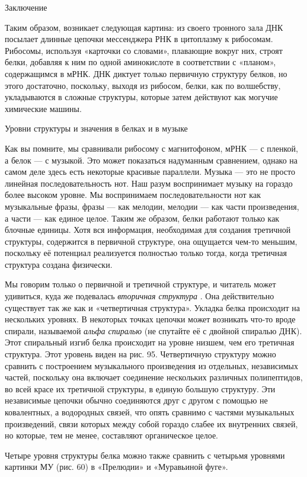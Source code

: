 \documentclass[../main.tex]{subfiles}
\begin{document}
Заключение

Таким образом, возникает следующая картина: из своего тронного зала ДНК посылает длинные цепочки мессенджера РНК в цитоплазму к рибосомам. Рибосомы, используя «карточки со словами», плавающие вокруг них, строят белки, добавляя к ним по одной аминокислоте в соответствии с «планом», содержащимся в мРНК\@. ДНК диктует только первичную структуру белков, но этого достаточно, поскольку, выходя из рибосом, белки, как по волшебству, укладываются в сложные структуры, которые затем действуют как могучие химические машины.

Уровни структуры и значения в белках и в музыке

Как вы помните, мы сравнивали рибосому с магнитофоном, мРНК --- с пленкой, а белок --- с музыкой. Это может показаться надуманным сравнением, однако на самом деле здесь есть некоторые красивые параллели. Музыка --- это не просто линейная последовательность нот. Наш разум воспринимает музыку на гораздо более высоком уровне. Мы воспринимаем последовательности нот как музыкальные фразы, фразы --- как мелодии, мелодии --- как части произведения, а части --- как единое целое. Таким же образом, белки работают только как блочные единицы. Хотя вся информация, необходимая для создания третичной структуры, содержится в первичной структуре, она ощущается чем-то меньшим, поскольку её потенциал реализуется полностью только тогда, когда третичная структура создана физически.

Мы говорим только о первичной и третичной структуре, и читатель может удивиться, куда же подевалась \emph{вторичная структура} . Она действительно существует так же как и «четвертичная структура». Укладка белка происходит на нескольких уровнях. В некоторых точках цепочки может возникать что-то вроде спирали, называемой \emph{альфа спиралью} (не спутайте её с двойной спиралью ДНК). Этот спиральный изгиб белка происходит на уровне низшем, чем его третичная структура. Этот уровень виден на рис. 95. Четвертичную структуру можно сравнить с построением музыкального произведения из отдельных, независимых частей, поскольку она включает соединение нескольких различных полипептидов, во всей красе их третичной структуры, в единую большую структуру. Эти независимые цепочки обычно соединяются друг с другом с помощью не ковалентных, а водородных связей, что опять сравнимо с частями музыкальных произведений, связи которых между собой гораздо слабее их внутренних связей, но которые, тем не менее, составляют органическое целое.

Четыре уровня структуры белка можно также сравнить с четырьмя уровнями картинки МУ (рис. 60) в «Прелюдии» и «Муравьиной фуге».
\end{document}
